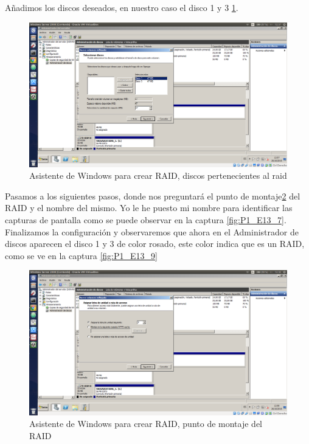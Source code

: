 Añadimos los discos deseados, en nuestro caso el disco 1 y 3 \ref{fig:P1_E13_5}.

\begin{figure}[H] %
\centering
\includegraphics[scale=0.3]{img/P1-Ejercicio13-5.png} 
\caption{Asistente de Windows para crear RAID, discos pertenecientes al raid} \label{fig:P1_E13_5}
\end{figure}

Pasamos a los siguientes pasos, donde nos preguntará el punto de montaje\ref{fig:P1_E13_6} del RAID y el nombre del mismo.
Yo le he puesto mi nombre para identificar las capturas de pantalla como se puede observar en la captura \ref{fig:P1_E13_7}.
Finalizamos la configuración y observaremos que ahora en el Administrador de discos aparecen el disco 1 y 3 de color rosado, 
este color indica que es un RAID, como se ve en la captura \ref{fig:P1_E13_9}

\begin{figure}[H] %
\centering
\includegraphics[scale=0.3]{img/P1-Ejercicio13-6.png} 
\caption{Asistente de Windows para crear RAID, punto de montaje del RAID} \label{fig:P1_E13_6}
\end{figure}

